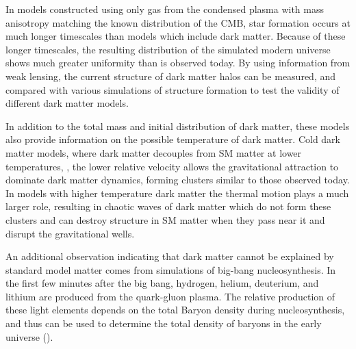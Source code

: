 In models constructed using only gas from the condensed plasma with mass anisotropy matching the known distribution of the CMB, star formation occurs at much longer timescales than models which include dark matter.
Because of these longer timescales, the resulting distribution of the simulated modern universe shows much greater uniformity than is observed today. 
By using information from weak lensing, the current structure of dark matter halos can be measured, and compared with various simulations of structure formation to test the validity of different dark matter models.

In addition to the total mass and initial distribution of dark matter, these models also provide information on the possible temperature of dark matter.
Cold dark matter models, where dark matter decouples from SM matter at lower temperatures, , the lower relative velocity allows the gravitational attraction to dominate dark matter dynamics, forming clusters similar to those observed today.
In models with higher temperature dark matter the thermal motion plays a much larger role, resulting in chaotic waves of dark matter which do not form these clusters and can destroy structure in SM matter when they pass near it and disrupt the gravitational wells.

An additional observation indicating that dark matter cannot be explained by standard model matter comes from simulations of big-bang nucleosynthesis. 
In the first few minutes after the big bang, hydrogen, helium, deuterium, and lithium are produced from the quark-gluon plasma. 
The relative production of these light elements depends on the total Baryon density during nucleosynthesis, and thus can be used to determine the total density of baryons in the early universe ().

